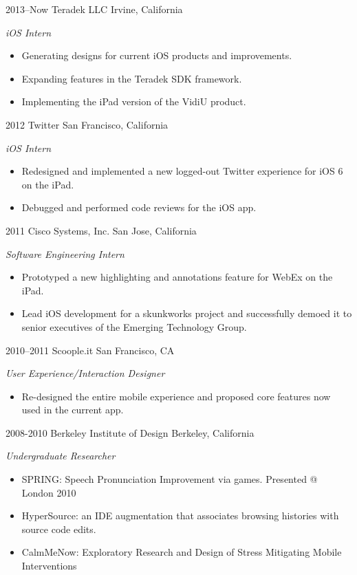 \documentclass[]{friggeri-cv} %
\begin{document}
\begin{entrylist}
\entry
{2013--Now}
{Teradek LLC}
{Irvine, California}
{\emph{iOS Intern}
\begin{itemize}
\item Generating designs for current iOS products and improvements.
\item Expanding features in the Teradek SDK framework.
\item Implementing the iPad version of the VidiU product.
\end{itemize}}
\entry
{2012}
{Twitter}
{San Francisco, California}
{\emph{iOS Intern}
\begin{itemize}
\item Redesigned and implemented a new logged-out Twitter experience for iOS 6 on the iPad.
\item Debugged and performed code reviews for the iOS app.
\end{itemize}}
\entry
{2011}
{Cisco Systems, Inc.}
{San Jose, California}
{\emph{Software Engineering Intern}
\begin{itemize}
\item Prototyped a new highlighting and annotations feature for WebEx on the iPad.
\item Lead iOS development for a skunkworks project and successfully demoed it to senior executives of the Emerging
Technology Group.
\end{itemize}}
\entry
{2010--2011}
{Scoople.it}
{San Francisco, CA}
{\emph{User Experience/Interaction Designer} 
\begin{itemize}
\item Re-designed the entire mobile experience and proposed core features now used in the current app.
\end{itemize}}
\entry
{2008-2010}
{Berkeley Institute of Design}
{Berkeley, California}
{\emph{Undergraduate Researcher} 
\begin{itemize}
\item SPRING: Speech Pronunciation Improvement via games. Presented @ London 2010
\item HyperSource: an IDE augmentation that associates browsing histories with source code edits. 
\item CalmMeNow: Exploratory Research and Design of Stress Mitigating Mobile Interventions
\end{itemize}}
\end{entrylist}
\end{document}
